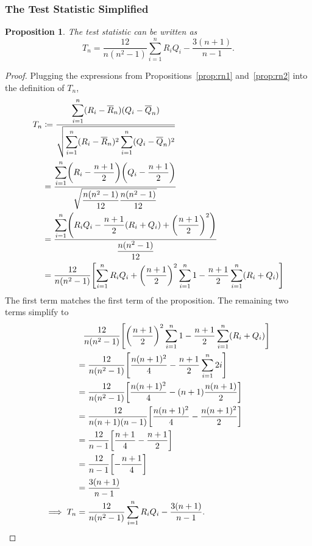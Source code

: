 \documentclass[letterpaper, reqno]{amsart}
\newtheorem{prop}{Proposition}[section]
\numberwithin{equation}{section}
\newcommand{\ddfrac}[2]{\frac{\displaystyle #1}{\displaystyle #2}}
\newcommand{\sumi}[2]{\sum_{#1=1}^{#2}}
\newcommand{\Rnbar}{\overline{R}_n}
\newcommand{\Qnbar}{\overline{Q}_n}
\begin{document}
\subsubsection{The Test Statistic Simplified}
\begin{prop}
  The test statistic can be written as
  \[ T_n = \frac{12}{n(n^2 - 1)} \sumi{i}{n}R_iQ_i - \frac{3(n+1)}{n-1}. \]
\end{prop}

\begin{proof}
  Plugging the expressions from Propositions~\ref{prop:rn1} and~\ref{prop:rn2}
  into the definition of $T_n$,
  \begin{align*}
    T_n &\coloneqq \ddfrac{\sumi{i}{n}(R_i - \Rnbar)(Q_i - \Qnbar)}
                              {\sqrt{\sumi{i}{n} (R_i - \Rnbar)^2 \sumi{i}{n} (Q_i - \Qnbar)^2}} \\
    &= \ddfrac{\sumi{i}{n}\mleft(R_i - \frac{n+1}{2}\mright)\mleft(Q_i - \frac{n+1}{2}\mright)}
                              {\sqrt{\frac{n(n^2 - 1)}{12} \frac{n(n^2 - 1)}{12}}} \\
    &= \ddfrac{\sumi{i}{n}\mleft(R_iQ_i 
                                - \frac{n+1}{2}(R_i + Q_i) 
                                + \mleft(\frac{n+1}{2}\mright)^2 \mright)}
                              {\frac{n(n^2 - 1)}{12}} \\
    &= \frac{12}{n(n^2 - 1)} \mleft[ \sumi{i}{n}R_iQ_i 
    + \mleft(\frac{n+1}{2}\mright)^2  \sumi{i}{n} 1
    - \frac{n+1}{2}\sumi{i}{n}(R_i + Q_i) \mright]
  \end{align*}
  The first term matches the first term of the proposition. The remaining two
  terms simplify to
  \begin{align*}
    &\phantom{=} \frac{12}{n(n^2 - 1)} \mleft[ \mleft(\frac{n+1}{2}\mright)^2  \sumi{i}{n} 1
    - \frac{n+1}{2}\sumi{i}{n}(R_i + Q_i) \mright]  \\
    &= \frac{12}{n(n^2 - 1)} \mleft[ \frac{n(n+1)^2}{4} - \frac{n+1}{2}\sumi{i}{n}2i \mright] \\
    &= \frac{12}{n(n^2 - 1)} \mleft[ \frac{n(n+1)^2}{4} - (n+1)\frac{n(n+1)}{2} \mright] \\
    &= \frac{12}{n(n+1)(n-1)} \mleft[ \frac{n(n+1)^2}{4} - \frac{n(n+1)^2}{2} \mright] \\
    &= \frac{12}{n-1} \mleft[ \frac{n+1}{4} - \frac{n+1}{2} \mright] \\
    &= \frac{12}{n-1} \mleft[ -\frac{n+1}{4} \mright] \\
    &= \frac{3(n+1)}{n-1} \\
    \implies T_n &= \frac{12}{n(n^2 - 1)} \sumi{i}{n}R_iQ_i - \frac{3(n+1)}{n-1}. \qedhere
  \end{align*}
\end{proof}
\end{document}
